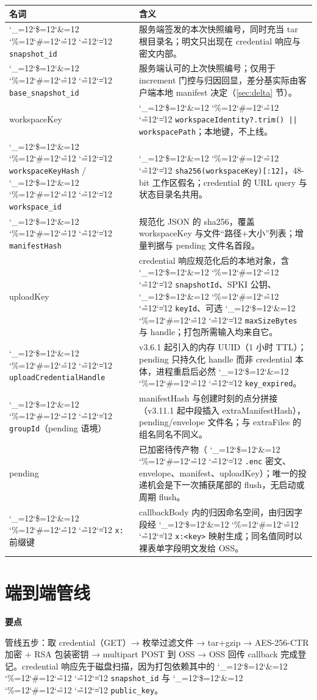 \documentclass[11pt,a4paper,fontset=none]{ctexart}
\newcommand{\cid}{%
  \begingroup
  \catcode`\_=12\relax \catcode`\$=12\relax \catcode`\&=12\relax
  \catcode`\%=12\relax \catcode`\#=12\relax \catcode`\^=12\relax
  \catcode`\~=12\relax \catcode`\|=12\relax
  \codeSpan}
\newcommand{\codeSpan}[1]{{\small\texttt{#1}}\endgroup}
\newenvironment{takeaway}{%
  \begin{mdframed}[backgroundcolor=black!4,linecolor=black!20,
    linewidth=0.5pt,skipabove=7pt,skipbelow=7pt,
    innertopmargin=5pt,innerbottommargin=5pt,
    innerleftmargin=8pt,innerrightmargin=8pt]
  \small\textbf{要点}\quad\ignorespaces
}{\end{mdframed}}
\begin{document}
\begin{longtable}{@{}p{4.8cm}p{10.6cm}@{}}
\toprule
名词 & 含义 \\
\midrule
\endhead
\bottomrule
\endfoot
\cid{snapshot_id} & 服务端签发的本次快照编号，同时充当 tar 根目录名；明文只出现在 credential 响应与密文内部。 \\
\cid{base_snapshot_id} & 服务端认可的上次快照编号；仅用于 increment 门控与归因回显，差分基实际由客户端本地 manifest 决定（\ref{sec:delta} 节）。 \\
workspaceKey & \cid{workspaceIdentity?.trim() || workspacePath}；本地键，不上线。 \\
\cid{workspaceKeyHash} / \cid{workspace_id} & \cid{sha256(workspaceKey)[:12]}，48-bit 工作区假名；credential 的 URL query 与状态目录名共用。 \\
\cid{manifestHash} & 规范化 JSON 的 sha256，覆盖 workspaceKey 与文件“路径+大小”列表；增量判据与 pending 文件名首段。 \\
uploadKey & credential 响应规范化后的本地对象，含 \cid{snapshotId}、SPKI 公钥、\cid{keyId}、可选 \cid{maxSizeBytes} 与 handle；打包所需输入均来自它。 \\
\cid{uploadCredentialHandle} & v3.6.1 起引入的内存 UUID（1 小时 TTL）；pending 只持久化 handle 而非 credential 本体，进程重启后必然 \cid{key_expired}。 \\
\cid{groupId}（pending 语境） & manifestHash 与创建时刻的点分拼接（v3.11.1 起中段插入 extraManifestHash），pending/envelope 文件名；与 extraFiles 的组名同名不同义。 \\
pending & 已加密待传产物（\cid{.enc} 密文、envelope、manifest、uploadKey）；唯一的投递机会是下一次捕获尾部的 flush，无启动或周期 flush。 \\
\cid{x:} 前缀键 & callbackBody 内的归因命名空间，由归因字段经 \cid{x:<key>} 映射生成；同名值同时以裸表单字段明文发给 OSS。 \\
\end{longtable}

\section{端到端管线}

\begin{takeaway}
管线五步：取 credential（GET）→ 枚举过滤文件 → tar+gzip → AES-256-CTR 加密 + RSA 包装密钥 → multipart POST 到 OSS → OSS 回传 callback 完成登记。credential 响应先于磁盘扫描，因为打包依赖其中的 \cid{snapshot_id} 与 \cid{public_key}。
\end{takeaway}
\end{document}

